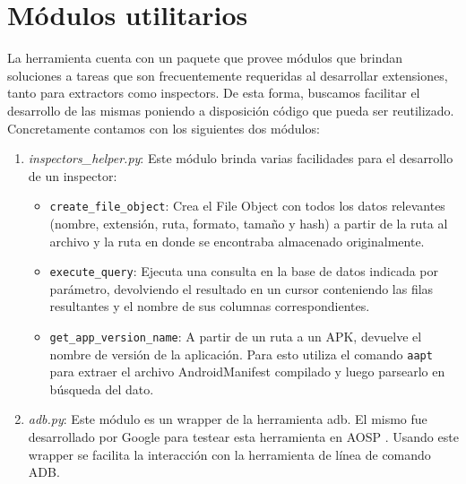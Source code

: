 \section{Módulos utilitarios}
\label{modulosUtilitarios}
La herramienta cuenta con un paquete que provee módulos que brindan soluciones a tareas que son frecuentemente requeridas al desarrollar extensiones, tanto para extractors como inspectors. De esta forma, buscamos facilitar el desarrollo de las mismas poniendo a disposición código que pueda ser reutilizado. Concretamente contamos con los siguientes dos módulos:

\begin{enumerate}
\item \emph{inspectors\_helper.py}: Este módulo brinda varias facilidades para el desarrollo de un inspector:
    \begin{itemize}
    \item \texttt{create\_file\_object}: Crea el File Object con todos los datos relevantes (nombre, extensión, ruta, formato, tamaño y hash) a partir de la ruta al archivo y la ruta en donde se encontraba almacenado originalmente.
    \item \texttt{execute\_query}: Ejecuta una consulta en la base de datos indicada por parámetro, devolviendo el resultado en un cursor conteniendo las filas resultantes y el nombre de sus columnas correspondientes.
    \item \texttt{get\_app\_version\_name}: A partir de un ruta a un APK, devuelve el nombre de versión de la aplicación. Para esto utiliza el comando \texttt{aapt} para extraer el archivo AndroidManifest compilado y luego parsearlo en búsqueda del dato.
    \end{itemize}
\item \emph{adb.py}: Este módulo es un wrapper de la herramienta adb. El mismo fue desarrollado por Google para testear esta herramienta en AOSP \cite{aosp}. Usando este wrapper se facilita la interacción con la herramienta de línea de comando ADB.
\end{enumerate}